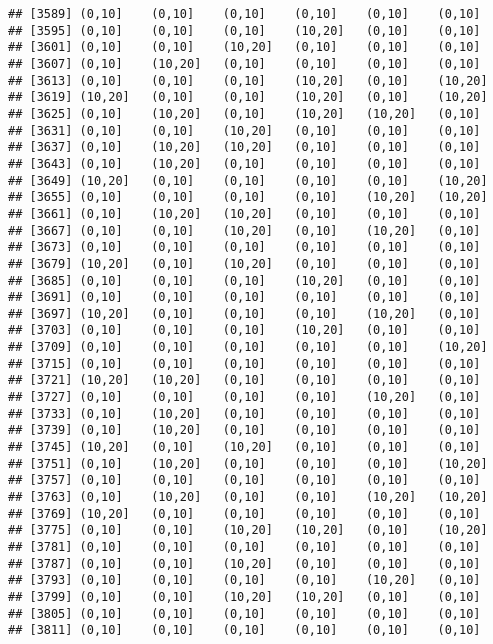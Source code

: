 \documentclass[]{article}
\begin{document}
\begin{verbatim}
## [3589] (0,10]    (0,10]    (0,10]    (0,10]    (0,10]    (0,10]   
## [3595] (0,10]    (0,10]    (0,10]    (10,20]   (0,10]    (0,10]   
## [3601] (0,10]    (0,10]    (10,20]   (0,10]    (0,10]    (0,10]   
## [3607] (0,10]    (10,20]   (0,10]    (0,10]    (0,10]    (0,10]   
## [3613] (0,10]    (0,10]    (0,10]    (10,20]   (0,10]    (10,20]  
## [3619] (10,20]   (0,10]    (0,10]    (10,20]   (0,10]    (10,20]  
## [3625] (0,10]    (10,20]   (0,10]    (10,20]   (10,20]   (0,10]   
## [3631] (0,10]    (0,10]    (10,20]   (0,10]    (0,10]    (0,10]   
## [3637] (0,10]    (10,20]   (10,20]   (0,10]    (0,10]    (0,10]   
## [3643] (0,10]    (10,20]   (0,10]    (0,10]    (0,10]    (0,10]   
## [3649] (10,20]   (0,10]    (0,10]    (0,10]    (0,10]    (10,20]  
## [3655] (0,10]    (0,10]    (0,10]    (0,10]    (10,20]   (10,20]  
## [3661] (0,10]    (10,20]   (10,20]   (0,10]    (0,10]    (0,10]   
## [3667] (0,10]    (0,10]    (10,20]   (0,10]    (10,20]   (0,10]   
## [3673] (0,10]    (0,10]    (0,10]    (0,10]    (0,10]    (0,10]   
## [3679] (10,20]   (0,10]    (10,20]   (0,10]    (0,10]    (0,10]   
## [3685] (0,10]    (0,10]    (0,10]    (10,20]   (0,10]    (0,10]   
## [3691] (0,10]    (0,10]    (0,10]    (0,10]    (0,10]    (0,10]   
## [3697] (10,20]   (0,10]    (0,10]    (0,10]    (10,20]   (0,10]   
## [3703] (0,10]    (0,10]    (0,10]    (10,20]   (0,10]    (0,10]   
## [3709] (0,10]    (0,10]    (0,10]    (0,10]    (0,10]    (10,20]  
## [3715] (0,10]    (0,10]    (0,10]    (0,10]    (0,10]    (0,10]   
## [3721] (10,20]   (10,20]   (0,10]    (0,10]    (0,10]    (0,10]   
## [3727] (0,10]    (0,10]    (0,10]    (0,10]    (10,20]   (0,10]   
## [3733] (0,10]    (10,20]   (0,10]    (0,10]    (0,10]    (0,10]   
## [3739] (0,10]    (10,20]   (0,10]    (0,10]    (0,10]    (0,10]   
## [3745] (10,20]   (0,10]    (10,20]   (0,10]    (0,10]    (0,10]   
## [3751] (0,10]    (10,20]   (0,10]    (0,10]    (0,10]    (10,20]  
## [3757] (0,10]    (0,10]    (0,10]    (0,10]    (0,10]    (0,10]   
## [3763] (0,10]    (10,20]   (0,10]    (0,10]    (10,20]   (10,20]  
## [3769] (10,20]   (0,10]    (0,10]    (0,10]    (0,10]    (0,10]   
## [3775] (0,10]    (0,10]    (10,20]   (10,20]   (0,10]    (10,20]  
## [3781] (0,10]    (0,10]    (0,10]    (0,10]    (0,10]    (0,10]   
## [3787] (0,10]    (0,10]    (10,20]   (0,10]    (0,10]    (0,10]   
## [3793] (0,10]    (0,10]    (0,10]    (0,10]    (10,20]   (0,10]   
## [3799] (0,10]    (0,10]    (10,20]   (10,20]   (0,10]    (0,10]   
## [3805] (0,10]    (0,10]    (0,10]    (0,10]    (0,10]    (0,10]   
## [3811] (0,10]    (0,10]    (0,10]    (0,10]    (0,10]    (0,10]   

\end{verbatim}
\end{document}
